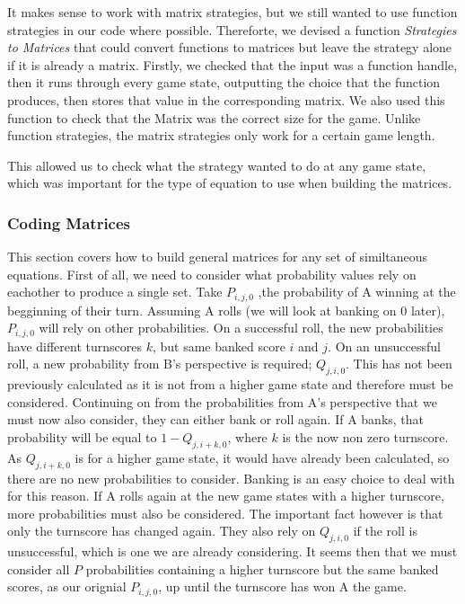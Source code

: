 \documentclass[a4paper,titlepage]{article}
\begin{document}
It makes sense to work with matrix strategies, but we still wanted to use function strategies in our code where possible. Thereforte, we devised a function \textit{Strategies to Matrices} that could convert functions to matrices but leave the strategy alone if it is already a matrix. Firstly, we checked that the input was a function handle, then it runs through every game state, outputting the choice that the function produces, then stores that value in the corresponding matrix. We also used this function to check that the Matrix was the correct size for the game. Unlike function strategies, the matrix strategies only work for a certain game length.


This allowed us to check what the strategy wanted to do at any game state, which was important for the type of equation to use when building the matrices.

\subsubsection{Coding Matrices}

This section covers how to build general matrices for any set of similtaneous equations. First of all, we need to consider what probability values rely on eachother to produce a single set. Take $P_{i,j,0}$ ,the probability of A winning at the begginning of their turn. Assuming A rolls (we will look at banking on 0 later), $P_{i,j,0}$ will rely on other probabilities. On a successful roll, the new probabilities have different turnscores $k$, but same banked score $i$ and $j$. On an unsuccessful roll, a new probability from B's perspective is required; $Q_{j,i,0}$. This has not been previously calculated as it is not from a higher game state and therefore must be considered. Continuing on from the probabilities from A's perspective that we must now also consider, they can either bank or roll again. If A banks, that probability will be equal to $1-Q_{j,i+k,0}$, where $k$ is the now non zero turnscore. As $Q_{j,i+k,0}$ is for a higher game state, it would have already been calculated, so there are no new probabilities to consider. Banking is an easy choice to deal with for this reason. If A rolls again at the new game states with a higher turnscore, more probabilities must also be considered. The important fact however is that only the turnscore has changed again. They also rely on $Q_{j,i,0}$ if the roll is unsuccessful, which is one we are already considering. It seems then that we must consider all $P$ probabilities containing a higher turnscore but the same banked scores, as our orignial $P_{i,j,0}$, up until the turnscore has won A the game.
\end{document}
